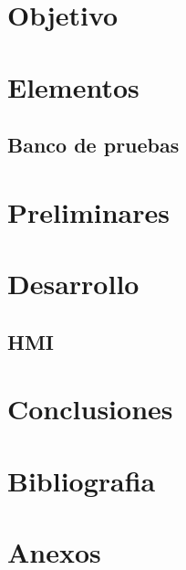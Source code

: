 \documentclass[12pt,a4paper]{article}
\begin{document}
\section{Objetivo}






\section{Elementos}


\subsection{Banco de pruebas}

\section{Preliminares}

	
\section{Desarrollo}





\subsection{HMI}


%

%



%



\section{Conclusiones}


		\newpage
\section{Bibliografia}


\printbibliography

\section{Anexos}

\end{document}
